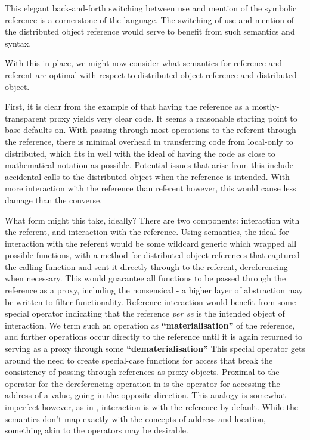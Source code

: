 This elegant back-and-forth switching between use and mention of the symbolic reference is a cornerstone of the language.
The switching of use and mention of the distributed object reference would serve to benefit from such semantics and syntax.

With this in place, we might now consider what semantics for reference and referent are optimal with respect to distributed object reference and distributed object.

First, it is clear from the example of  that having the reference as a mostly-transparent proxy yields very clear code.
It seems a reasonable starting point to base defaults on.
With passing through most operations to the referent through the reference, there is minimal overhead in transferring code from local-only to distributed, which fits in well with the ideal of having the code as close to mathematical notation as possible.
Potential issues that arise from this include accidental calls to the distributed object when the reference is intended.
With more interaction with the reference than referent however, this would cause less damage than the converse.

What form might this take, ideally?
There are two components: interaction with the referent, and interaction with the reference.
Using \R{} semantics, the ideal for interaction with the referent would be some wildcard generic which wrapped all possible functions, with a method for distributed object references that captured the calling function and sent it directly through to the referent, dereferencing when necessary.
This would guarantee all functions to be passed through the reference as a proxy, including the nonsensical - a higher layer of abstraction may be written to filter functionality.
Reference interaction would benefit from some special operator indicating that the reference \emph{per se} is the intended object of interaction.
We term such an operation as \textbf{``materialisation''} of the reference, and further operations occur directly to the reference until it is again returned to serving as a proxy through some \textbf{``dematerialisation''} This special operator gets around the need to create special-case functions for access that break the consistency of passing through references as proxy objects.
Proximal to the  operator for the dereferencing operation in  is the  operator for accessing the address of a value, going in the opposite direction.
This analogy is somewhat imperfect however, as in , interaction is with the reference by default.
While the semantics don't map exactly with the concepts of address and location, something akin to the operators may be desirable.

